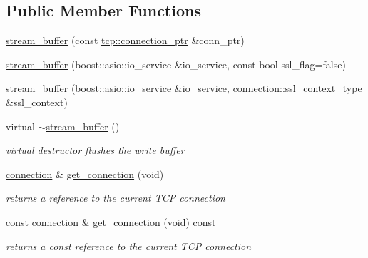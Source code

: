 \subsection*{Public Member Functions}
\begin{DoxyCompactItemize}
\item 
\hyperlink{classpion_1_1tcp_1_1stream__buffer_adc900819bfa97a760d09f3a1e09f3465}{stream\-\_\-buffer} (const \hyperlink{namespacepion_1_1tcp_a6c9b7497068009f6d81d95ec0b0627d6}{tcp\-::connection\-\_\-ptr} \&conn\-\_\-ptr)
\item 
\hyperlink{classpion_1_1tcp_1_1stream__buffer_a0c9993aa8a0c8d85f6808e354c4892b1}{stream\-\_\-buffer} (boost\-::asio\-::io\-\_\-service \&io\-\_\-service, const bool ssl\-\_\-flag=false)
\item 
\hyperlink{classpion_1_1tcp_1_1stream__buffer_a6ba1babc9c1277e773f4ec5d3087a284}{stream\-\_\-buffer} (boost\-::asio\-::io\-\_\-service \&io\-\_\-service, \hyperlink{classpion_1_1tcp_1_1connection_a8587c35bbf48a119aa82f228e779a30e}{connection\-::ssl\-\_\-context\-\_\-type} \&ssl\-\_\-context)
\item 
virtual \hyperlink{classpion_1_1tcp_1_1stream__buffer_af72833c05fa921aba4404d3a72edd7cb}{$\sim$stream\-\_\-buffer} ()
\begin{DoxyCompactList}\small\item\em virtual destructor flushes the write buffer \end{DoxyCompactList}\item 
\hyperlink{classpion_1_1tcp_1_1connection}{connection} \& \hyperlink{classpion_1_1tcp_1_1stream__buffer_a9ecf83066d0e3fc5cf9922f4c2f1e24d}{get\-\_\-connection} (void)
\begin{DoxyCompactList}\small\item\em returns a reference to the current T\-C\-P connection \end{DoxyCompactList}\item 
const \hyperlink{classpion_1_1tcp_1_1connection}{connection} \& \hyperlink{classpion_1_1tcp_1_1stream__buffer_a4a2d945145898de7c7b0919a97db49bb}{get\-\_\-connection} (void) const 
\begin{DoxyCompactList}\small\item\em returns a const reference to the current T\-C\-P connection \end{DoxyCompactList}\end{DoxyCompactItemize}
